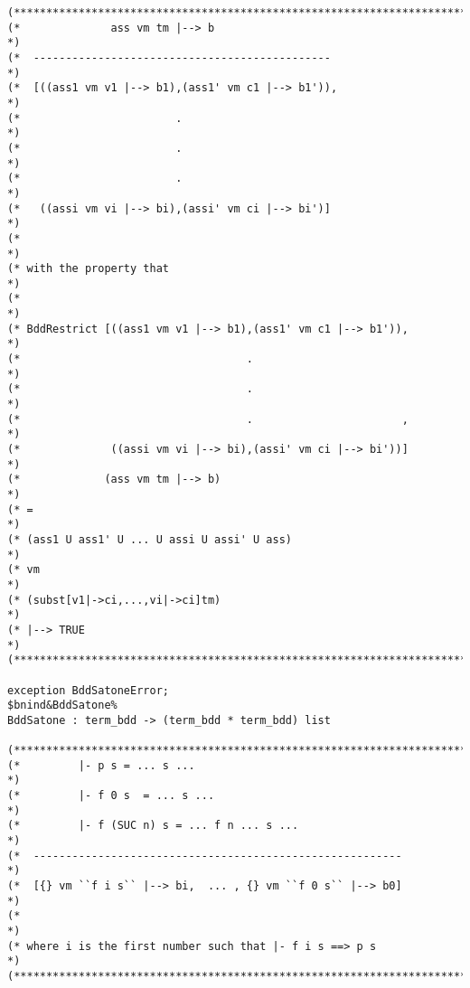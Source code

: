 \documentclass[12pt]{article}
\begin{document}
\begin{footnotesize}
\begin{Verbatim}[commandchars=\$\&\%]
(*****************************************************************************)
(*              ass vm tm |--> b                                             *)
(*  ----------------------------------------------                           *)
(*  [((ass1 vm v1 |--> b1),(ass1' vm c1 |--> b1')),                          *)
(*                        .                                                  *)
(*                        .                                                  *)
(*                        .                                                  *)
(*   ((assi vm vi |--> bi),(assi' vm ci |--> bi')]                           *)
(*                                                                           *)
(* with the property that                                                    *)
(*                                                                           *)
(* BddRestrict [((ass1 vm v1 |--> b1),(ass1' vm c1 |--> b1')),               *)
(*                                   .                                       *)
(*                                   .                                       *)
(*                                   .                       ,               *)
(*              ((assi vm vi |--> bi),(assi' vm ci |--> bi'))]               *)
(*             (ass vm tm |--> b)                                            *)
(* =                                                                         *)
(* (ass1 U ass1' U ... U assi U assi' U ass)                                 *)
(* vm                                                                        *)
(* (subst[v1|->ci,...,vi|->ci]tm)                                            *)
(* |--> TRUE                                                                 *)
(*****************************************************************************)

exception BddSatoneError;
$bnind&BddSatone%
BddSatone : term_bdd -> (term_bdd * term_bdd) list

(*****************************************************************************)
(*         |- p s = ... s ...                                                *)
(*         |- f 0 s  = ... s ...                                             *)
(*         |- f (SUC n) s = ... f n ... s ...                                *)
(*  ---------------------------------------------------------                *)
(*  [{} vm ``f i s`` |--> bi,  ... , {} vm ``f 0 s`` |--> b0]                *)
(*                                                                           *)
(* where i is the first number such that |- f i s ==> p s                    *)
(*****************************************************************************)


\end{Verbatim}
\end{footnotesize}
\end{document}
